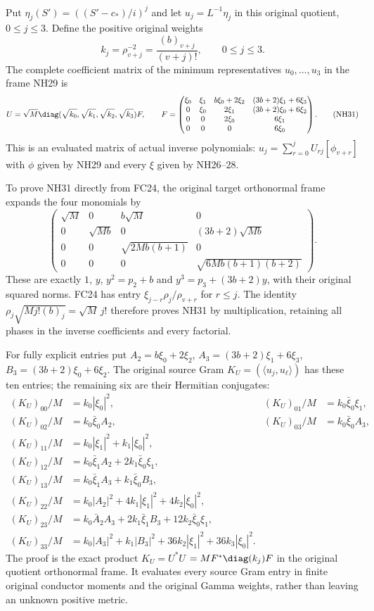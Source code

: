 Put $\eta_j(S')=((S'-c_*)/i)^j$ and let
$u_j=L^{-1}\eta_j$ in this original quotient, $0\le j\le3$.
Define the positive original weights
\[
 k_j=\rho_{v+j}^{-2}=\frac{(b)_{v+j}}{(v+j)!},
 \qquad 0\le j\le3.
 \tag{NH30}
\]
The complete coefficient matrix of the minimum representatives
$u_0,\ldots,u_3$ in the frame NH29 is
\[
 U=\sqrt M\diag(\sqrt{k_0},\sqrt{k_1},\sqrt{k_2},\sqrt{k_3})F,
 \qquad
 F=\begin{pmatrix}
 \xi_0&\xi_1&b\xi_0+2\xi_2&(3b+2)\xi_1+6\xi_3\\
 0&\xi_0&2\xi_1&(3b+2)\xi_0+6\xi_2\\
 0&0&2\xi_0&6\xi_1\\
 0&0&0&6\xi_0
 \end{pmatrix}.
 \tag{NH31}
\]
This is an evaluated matrix of actual inverse polynomials:
$u_j=\sum_{r=0}^jU_{rj}[\phi_{v+r}]$ with $\phi$ given
by NH29 and every $\xi$ given by NH26--28.

To prove NH31 directly from FC24, the original target
orthonormal frame expands the four monomials by
\[
 \begin{pmatrix}
 \sqrt M&0&b\sqrt M&0\\
 0&\sqrt{Mb}&0&(3b+2)\sqrt{Mb}\\
 0&0&\sqrt{2Mb(b+1)}&0\\
 0&0&0&\sqrt{6Mb(b+1)(b+2)}
 \end{pmatrix}.
 \tag{NH32}
\]
These are exactly $1$, $y$, $y^2=p_2+b$ and
$y^3=p_3+(3b+2)y$, with their original squared norms.
FC24 has entry $\xi_{j-r}\rho_j/\rho_{v+r}$ for $r\le j$.
The identity
$\rho_j\sqrt{Mj!(b)_j}=\sqrt M\,j!$
therefore proves NH31 by multiplication, retaining all phases
in the inverse coefficients and every factorial.

For fully explicit entries put
$A_2=b\xi_0+2\xi_2$, $A_3=(3b+2)\xi_1+6\xi_3$,
$B_3=(3b+2)\xi_0+6\xi_2$. The original source Gram
$K_U=(\langle u_j,u_\ell\rangle)$ has these ten entries;
the remaining six are their Hermitian conjugates:
\[
\begin{aligned}
 (K_U)_{00}/M&=k_0|\xi_0|^2,&
 (K_U)_{01}/M&=k_0\bar\xi_0\xi_1,\\
 (K_U)_{02}/M&=k_0\bar\xi_0A_2,&
 (K_U)_{03}/M&=k_0\bar\xi_0A_3,\\
 (K_U)_{11}/M&=k_0|\xi_1|^2+k_1|\xi_0|^2,\\
 (K_U)_{12}/M&=k_0\bar\xi_1A_2+2k_1\bar\xi_0\xi_1,\\
 (K_U)_{13}/M&=k_0\bar\xi_1A_3+k_1\bar\xi_0B_3,\\
 (K_U)_{22}/M&=k_0|A_2|^2+4k_1|\xi_1|^2+4k_2|\xi_0|^2,\\
 (K_U)_{23}/M&=k_0\bar A_2A_3+2k_1\bar\xi_1B_3
                                       +12k_2\bar\xi_0\xi_1,\\
 (K_U)_{33}/M&=k_0|A_3|^2+k_1|B_3|^2
                                +36k_2|\xi_1|^2+36k_3|\xi_0|^2.
\end{aligned}\tag{NH33}
\]
The proof is the exact product $K_U=U^*U$
$=MF^*\diag(k_j)F$ in the original quotient orthonormal
frame. It evaluates every source Gram entry in finite original
conductor moments and the original Gamma weights, rather
than leaving an unknown positive metric.

